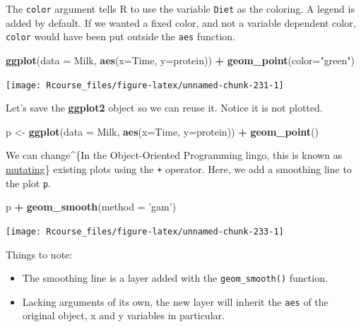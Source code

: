 \documentclass[]{book}
\newenvironment{Shaded}{\begin{snugshade}}{\end{snugshade}}
\newcommand{\KeywordTok}[1]{\textcolor[rgb]{0.13,0.29,0.53}{\textbf{#1}}}
\newcommand{\DataTypeTok}[1]{\textcolor[rgb]{0.13,0.29,0.53}{#1}}
\newcommand{\StringTok}[1]{\textcolor[rgb]{0.31,0.60,0.02}{#1}}
\newcommand{\OperatorTok}[1]{\textcolor[rgb]{0.81,0.36,0.00}{\textbf{#1}}}
\newcommand{\NormalTok}[1]{#1}
\providecommand{\tightlist}{%
  \setlength{\itemsep}{0pt}\setlength{\parskip}{0pt}}
\theoremstyle{definition}
\theoremstyle{definition}
\theoremstyle{definition}
\theoremstyle{remark}
\begin{document}
The \texttt{color} argument tells R to use the variable \texttt{Diet} as
the coloring. A legend is added by default. If we wanted a fixed color,
and not a variable dependent color, \texttt{color} would have been put
outside the \texttt{aes} function.

\begin{Shaded}
\begin{Highlighting}[]
\KeywordTok{ggplot}\NormalTok{(}\DataTypeTok{data =}\NormalTok{ Milk, }\KeywordTok{aes}\NormalTok{(}\DataTypeTok{x=}\NormalTok{Time, }\DataTypeTok{y=}\NormalTok{protein)) }\OperatorTok{+}
\StringTok{  }\KeywordTok{geom_point}\NormalTok{(}\DataTypeTok{color=}\StringTok{"green"}\NormalTok{)}
\end{Highlighting}
\end{Shaded}

\texttt{[image: Rcourse\_files/figure-latex/unnamed-chunk-231-1]}

Let's save the \textbf{ggplot2} object so we can reuse it. Notice it is
not plotted.

\begin{Shaded}
\begin{Highlighting}[]
\NormalTok{p <-}\StringTok{ }\KeywordTok{ggplot}\NormalTok{(}\DataTypeTok{data =}\NormalTok{ Milk, }\KeywordTok{aes}\NormalTok{(}\DataTypeTok{x=}\NormalTok{Time, }\DataTypeTok{y=}\NormalTok{protein)) }\OperatorTok{+}
\StringTok{  }\KeywordTok{geom_point}\NormalTok{()}
\end{Highlighting}
\end{Shaded}

We can change\^{}\{In the Object-Oriented Programming lingo, this is
known as
\href{https://en.wikipedia.org/wiki/Immutable_object}{mutating}\}
existing plots using the \texttt{+} operator. Here, we add a smoothing
line to the plot \texttt{p}.

\begin{Shaded}
\begin{Highlighting}[]
\NormalTok{p }\OperatorTok{+}\StringTok{ }\KeywordTok{geom_smooth}\NormalTok{(}\DataTypeTok{method =} \StringTok{'gam'}\NormalTok{)}
\end{Highlighting}
\end{Shaded}

\texttt{[image: Rcourse\_files/figure-latex/unnamed-chunk-233-1]}

Things to note:

\begin{itemize}
\tightlist
\item
  The smoothing line is a layer added with the \texttt{geom\_smooth()}
  function.
\item
  Lacking arguments of its own, the new layer will inherit the
  \texttt{aes} of the original object, x and y variables in particular.
\end{itemize}
\end{document}
